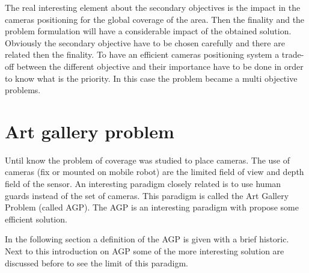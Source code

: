 The real interesting element about the secondary objectives is the impact in the cameras positioning for the global coverage of the area. Then the finality and the problem formulation will have a considerable impact of the obtained solution. Obviously the secondary objective have to be chosen carefully and there are related then the finality. To have an efficient cameras positioning system a trade-off between the different objective  and their importance have to be done in order to know what is the priority. In this case the problem became a multi objective problems. 


\section{Art gallery problem} \label{sec:AGP}


Until know the problem of coverage was studied to place cameras. The use of cameras (fix or mounted on mobile robot) are the limited field of view  and  depth field of the sensor. An interesting paradigm closely related is  to use human guards  instead  of the set of cameras.  This paradigm is called the Art Gallery Problem (called AGP). The AGP is an interesting  paradigm with propose some efficient solution. 

In the following section  a definition of the AGP is given with a brief historic. Next to this introduction on AGP some of the more interesting solution  are discussed before to see the limit of this paradigm.



